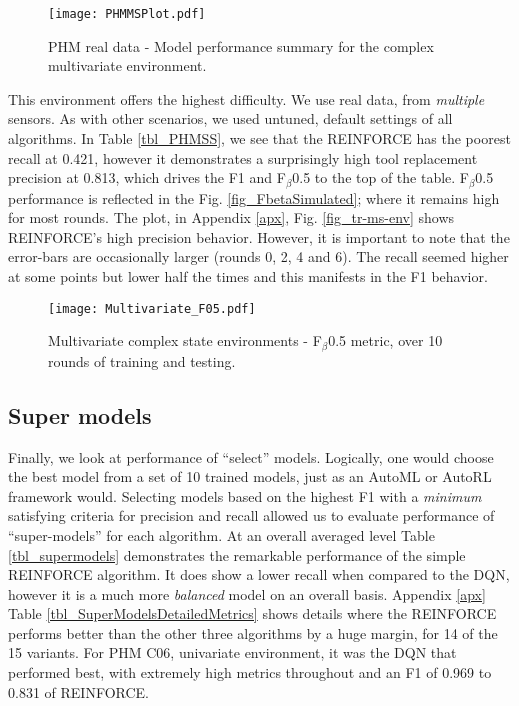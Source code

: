 \documentclass[referee, sn-mathphys-num]{sn-jnl}
\begin{document}
	\begin{figure}[hbt!]
		\centering
		\texttt{[image: PHMMSPlot.pdf]}  
		\caption{PHM real data - Model performance summary for the complex multivariate environment.}
		\label{fig_PHMMS}
	\end{figure}
	This environment offers the highest difficulty. We use real data, from \textit{multiple} sensors. As with other scenarios, we used untuned, default settings of all algorithms. In Table \ref{tbl_PHMSS}, we see that the REINFORCE has the poorest recall at 0.421, however it demonstrates a surprisingly high tool replacement precision at 0.813, which drives the F1 and F$_\beta$0.5 to the top of the table. F$_\beta$0.5 performance is reflected in the Fig. \ref{fig_FbetaSimulated}; where it remains high for most rounds. The plot, in Appendix \ref{apx}, Fig. \ref{fig_tr-ms-env} shows REINFORCE's high precision behavior. However, it is important to note that the error-bars are occasionally larger (rounds 0, 2, 4 and 6). The recall seemed higher at some points but lower half the times and this manifests in the F1 behavior.
	\begin{figure}[hbt!]
		\centering
		\texttt{[image: Multivariate\_F05.pdf]}  
		\caption{Multivariate complex state environments - F$_\beta$0.5 metric, over 10 rounds of training and testing.}
		\label{fig_FbetaPHMMS}
	\end{figure}
	
	\subsection{Super models}
	Finally, we look at performance of ``select'' models. Logically, one would choose the best model from a set of 10 trained models, just as an AutoML or AutoRL framework would. Selecting models based on the highest F1 with a \textit{minimum} satisfying criteria for precision and recall allowed us to evaluate performance of ``super-models'' for each algorithm. At an overall averaged level Table \ref{tbl_supermodels} demonstrates the remarkable performance of the simple REINFORCE algorithm. It does show a lower recall when compared to the DQN, however it is a much more \textit{balanced} model on an overall basis. Appendix \ref{apx} Table \ref{tbl_SuperModelsDetailedMetrics} shows details where the REINFORCE performs better than the other three algorithms by a huge margin, for 14 of the 15 variants. For PHM C06, univariate environment, it was the DQN that performed best, with extremely high metrics throughout and an F1 of 0.969 to 0.831 of REINFORCE.
	
\end{document}
